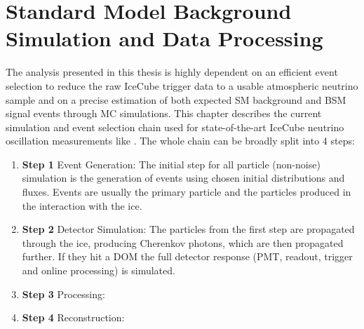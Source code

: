 \setchapterpreamble[u]{\margintoc}



\chapter{Standard Model Background Simulation and Data Processing}

The analysis presented in this thesis is highly dependent on an efficient event selection to reduce the raw IceCube trigger data to a usable atmospheric neutrino sample and on a precise estimation of both expected SM background and BSM signal events through MC simulations. This chapter describes the current simulation and event selection chain used for state-of-the-art IceCube neutrino oscillation measurements like . The whole chain can be broadly split into 4 steps:

\begin{enumerate}[wide]
    
    \item[]{\textbf{Step 1} Event Generation:} The initial step for all particle (non-noise) simulation is the generation of events using chosen initial distributions and fluxes. Events are usually the primary particle and the particles produced in the interaction with the ice.

    \item[]{\textbf{Step 2} Detector Simulation:} The particles from the first step are propagated through the ice, producing Cherenkov photons, which are then propagated further. If they hit a DOM the full detector response (PMT, readout, trigger and online processing) is simulated.
    
    \item[]{\textbf{Step 3} Processing:} 
    


    \item[]{\textbf{Step 4} Reconstruction:}
    

\end{enumerate}


